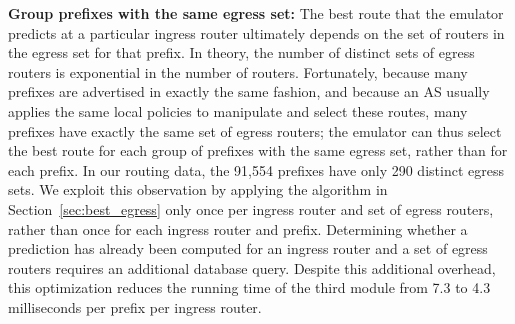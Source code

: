
\textbf{Group prefixes with the same egress set:} The best route that
the emulator predicts at a particular ingress router ultimately depends
on the set of routers in the egress set for that prefix.  In theory, the
number of distinct sets of egress routers is exponential in the number
of routers.  Fortunately, because many prefixes are advertised in
exactly the same fashion, and because an AS usually applies the
same local policies to manipulate and select these routes, many prefixes have 
exactly the same set of egress routers; the emulator can thus select the 
best route for each group of prefixes with the same egress set, rather than 
for each prefix.  In our routing data, the 91,554 prefixes have only 290
distinct egress sets.  We exploit this observation by applying the
algorithm in Section~\ref{sec:best_egress} only once per ingress router
and set of egress routers, rather than once for each ingress router and
prefix.  Determining whether a prediction has already been computed for
an ingress router and a set of egress routers requires an additional
database query.  Despite this additional overhead, this optimization
reduces the running time of the third module from 7.3 to 4.3
milliseconds per prefix per ingress router.

